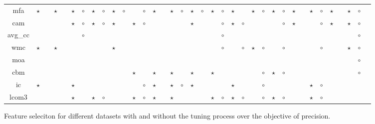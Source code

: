 \documentclass{acm_proc_article-sp}
\begin{document}
\begin{figure*}[!ht]
{\begin{tabular}{c|c c|c c|c c|c c|c c|c c|c c|c c|c c|c c|c c|c c|c c|c c|c c|c c|c c|c }
mfa& $\star$& & $\star$& & $\star$& $\circ$& $\star$& $\circ$& $\star$& $\circ$& & $\circ$& $\star$& & $\star$& $\circ$& $\star$& $\circ$& $\star$& $\circ$& $\star$& & $\star$& $\circ$& $\star$& $\circ$& $\star$& & $\star$& $\circ$& $\star$& & $\star$& $\circ$\\
cam& & & & & $\star$& $\circ$& $\star$& $\circ$& $\star$& & $\star$& $\circ$& & & & & $\star$& & & $\circ$& $\star$& $\circ$& & & & $\circ$& $\star$& & & $\circ$& $\star$& & $\star$& $\circ$\\
avg\_cc& & & & & & $\circ$& & & & & & & & & & & & & & $\circ$& & & & & & & & & & & & & & $\circ$\\
wmc& $\star$& & $\star$& & & & & & $\star$& & & & & & & & & & & $\circ$& & $\circ$& $\star$& $\circ$& & $\circ$& & & & $\circ$& & & $\star$& $\circ$\\
moa& & & & & & & & & & & & & & & & & & & & & & & & & & & & & & & & & & $\circ$\\
cbm& & & & & & & & & & & $\star$& & $\star$& & $\star$& & $\star$& & $\star$& & & & & $\circ$& $\star$& $\circ$& & & & & & & & $\circ$\\
ic& $\star$& & & & $\star$& & & & & & & $\circ$& $\star$& & $\star$& $\circ$& $\star$& & & & $\star$& & & $\circ$& & & & & $\star$& $\circ$& & & & \\
lcom3& & & & & $\star$& & $\star$& $\circ$& & & $\star$& $\circ$& $\star$& & $\star$& & & & $\star$& $\circ$& $\star$& $\circ$& & $\circ$& $\star$& $\circ$& & & $\star$& $\circ$& & & & \\

  \end{tabular}}
  \caption{Feature seleciton for different datasets with and without the tuning process over the objective of precision. }
\end{figure*}
\end{document}
